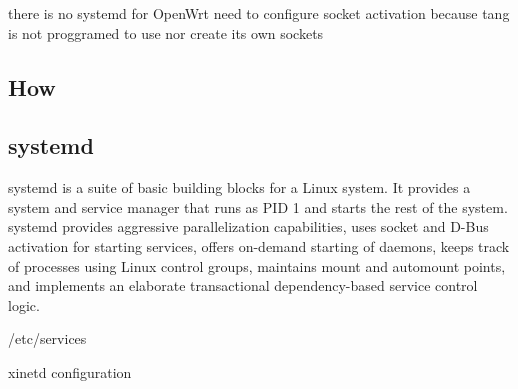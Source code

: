 there is no systemd for OpenWrt
need to configure socket activation because tang is not proggramed to use nor create its own sockets
\subsection{How }
\subsection{systemd}\label{systemd} %
systemd is a suite of basic building blocks for a Linux system.
It provides a system and service manager that runs as PID 1 and starts the rest of the system.
systemd provides aggressive parallelization capabilities, uses socket and D-Bus activation for starting services,
 offers on-demand starting of daemons, keeps track of processes using Linux control groups, maintains mount and automount points,
 and implements an elaborate transactional dependency-based service control logic.

/etc/services

xinetd configuration

\subsection{}


